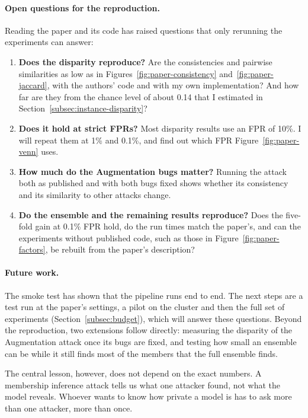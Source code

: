 \documentclass[a4paper]{article}
\begin{document}
\paragraph{Open questions for the reproduction.}
Reading the paper and its code has raised questions that only rerunning the experiments can answer:
\begin{enumerate}
  \item \textbf{Does the disparity reproduce?} Are the consistencies and pairwise similarities as low as in Figures~\ref{fig:paper-consistency} and~\ref{fig:paper-jaccard}, with the authors' code and with my own implementation? And how far are they from the chance level of about 0.14 that I estimated in Section~\ref{subsec:instance-disparity}?
  \item \textbf{Does it hold at strict FPRs?} Most disparity results use an FPR of 10\%. I will repeat them at 1\% and 0.1\%, and find out which FPR Figure~\ref{fig:paper-venn} uses.
  \item \textbf{How much do the Augmentation bugs matter?} Running the attack both as published and with both bugs fixed shows whether its consistency and its similarity to other attacks change.
  \item \textbf{Do the ensemble and the remaining results reproduce?} Does the five-fold gain at 0.1\% FPR hold, do the run times match the paper's, and can the experiments without published code, such as those in Figure~\ref{fig:paper-factors}, be rebuilt from the paper's description?
\end{enumerate}

\paragraph{Future work.}
The smoke test has shown that the pipeline runs end to end.
The next steps are a test run at the paper's settings, a pilot on the cluster and then the full set of experiments (Section~\ref{subsec:budget}), which will answer these questions.
Beyond the reproduction, two extensions follow directly: measuring the disparity of the Augmentation attack once its bugs are fixed, and testing how small an ensemble can be while it still finds most of the members that the full ensemble finds.

The central lesson, however, does not depend on the exact numbers.
A membership inference attack tells us what one attacker found, not what the model reveals.
Whoever wants to know how private a model is has to ask more than one attacker, more than once.
\end{document}
